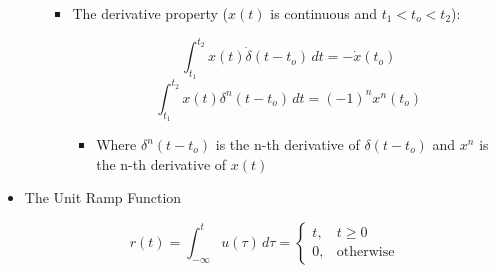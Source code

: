 \begin{itemize}
\begin{itemize}
          \begin{itemize}

            \item The derivative property ($x(t)$ is continuous and $t_1<t_o<t_2$):

              $$\int_{t_1}^{t_2}x(t)\dot{\delta}(t-t_o)\,dt=-\dot{x}(t_o)$$
              $$\int_{t_1}^{t_2}x(t)\delta^n(t-t_o)\,dt=(-1)^nx^n(t_o)$$

              \begin{itemize}

                \item Where $\delta^n(t-t_o)$ is the n-th derivative of $\delta(t-t_o)$ and $x^n$ is the n-th derivative of $x(t)$

              \end{itemize}

          \end{itemize}

    \end{itemize}

  \item The Unit Ramp Function
    
    $$r(t)=\int_{-\infty}^tu(\tau)\,d\tau=\left\{\begin{array}{ll}t,&t\geq0\\0,&\text{otherwise}\end{array}$$

\end{itemize}



